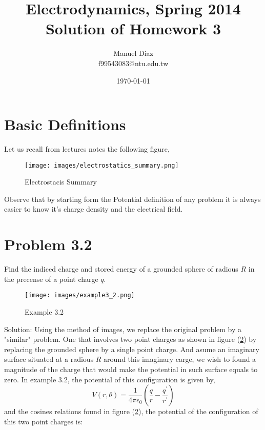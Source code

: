 

%

\title{Electrodynamics, Spring 2014 \\ Solution of Homework 3}
\author{Manuel Diaz\\
			f99543083@ntu.edu.tw\\}
\date{\today}


\maketitle

\section{Basic Definitions}
Let us recall from lectures notes the following figure,
\begin{figure}[h]
	\centering
	\texttt{[image: images/electrostatics\_summary.png]} 
	\caption{Electrostacis Summary}
	\label{fig:electrostatics_summary}
\end{figure}

Observe that by starting form the Potential definition of any problem it is always easier to know it's charge density and the electrical field.

\section{Problem 3.2}
Find the indiced charge and stored energy of a grounded sphere of radious $R$ in the precense of a point charge $q$.\\
\begin{figure}
	\centering
	\texttt{[image: images/example3\_2.png]} 
	\caption{Example 3.2}
	\label{fig:example_3.2}
\end{figure}

Solution: Using the method of images, we replace the original problem by a "similar" problem. One that involves two point charges as shown in figure (\ref{fig:example_3.2}) by replacing the grounded sphere by a single point charge. And asume an imaginary surface situated at a radious $R$ around this imaginary carge, we wish to found a magnitude of the charge that would make the potential in such surface equals to zero. In example 3.2, the potential of this configuration is given by,
\begin{equation}
	V(r,\theta) = \frac{1}{4\pi\epsilon_0}
	\left(
	\frac{q}{r} -
	\frac{q^\prime}{r^\prime}
	\right)
\end{equation}
and the cosines relations found in figure (\ref{fig:example_3.2}), the potential of the configuration of this two point charges is:

